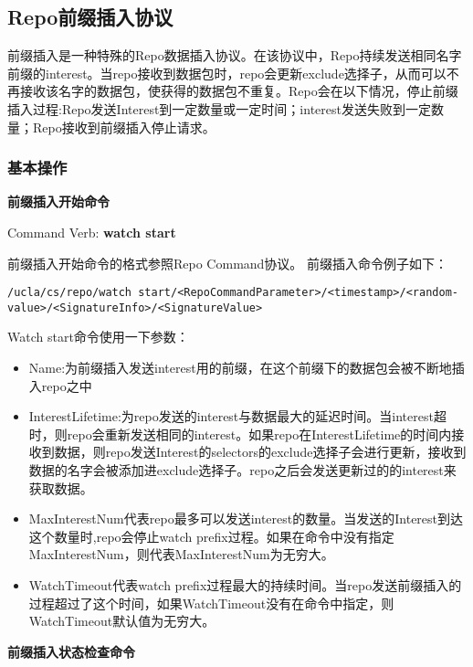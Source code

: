 \subsection{Repo前缀插入协议}
前缀插入是一种特殊的Repo数据插入协议。在该协议中，Repo持续发送相同名字前缀的interest。当repo接收到数据包时，repo会更新exclude选择子，从而可以不再接收该名字的数据包，使获得的数据包不重复。Repo会在以下情况，停止前缀插入过程:Repo发送Interest到一定数量或一定时间；interest发送失败到一定数量；Repo接收到前缀插入停止请求。

\subsubsection{基本操作}
\textbf{前缀插入开始命令}

Command Verb: \textbf{watch start}

前缀插入开始命令的格式参照Repo Command协议。 前缀插入命令例子如下：

\begin{framed}
\begin{scriptsize}
\begin{verbatim}
/ucla/cs/repo/watch start/<RepoCommandParameter>/<timestamp>/<random-value>/<SignatureInfo>/<SignatureValue>
\end{verbatim}
\end{scriptsize}
\end{framed}

Watch start命令使用一下参数：

\begin{itemize}
\item Name:为前缀插入发送interest用的前缀，在这个前缀下的数据包会被不断地插入repo之中
\item InterestLifetime:为repo发送的interest与数据最大的延迟时间。当interest超时，则repo会重新发送相同的interest。如果repo在InterestLifetime的时间内接收到数据，则repo发送Interest的selectors的exclude选择子会进行更新，接收到数据的名字会被添加进exclude选择子。repo之后会发送更新过的的interest来获取数据。
\item MaxInterestNum代表repo最多可以发送interest的数量。当发送的Interest到达这个数量时,repo会停止watch prefix过程。如果在命令中没有指定MaxInterestNum，则代表MaxInterestNum为无穷大。
\item WatchTimeout代表watch prefix过程最大的持续时间。当repo发送前缀插入的过程超过了这个时间，如果WatchTimeout没有在命令中指定，则WatchTimeout默认值为无穷大。
\end{itemize}

\textbf{前缀插入状态检查命令}

